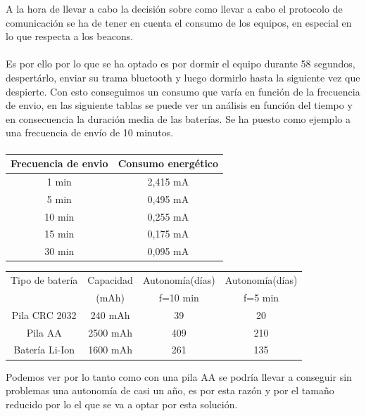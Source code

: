 \documentclass[a4paper ,12pt, onecolumn]{article}
\begin{document}
            A la hora de llevar a cabo la decisión sobre como llevar a cabo el protocolo de comunicación se ha de tener en cuenta 
            el consumo de los equipos, en especial en lo que respecta a los beacons.
            \paragraph{}
            Es por ello por lo que se ha optado es por dormir el equipo durante 58 segundos, despertárlo,
            enviar su trama bluetooth y luego dormirlo hasta la siguiente vez que despierte.
            Con esto conseguimos un consumo que varía en función de la frecuencia de envio, en las siguiente tablas
            se puede ver un análisis en función del tiempo y en consecuencia la duración media de las baterías.
            Se ha puesto como ejemplo a una frecuencia de envío de 10 minutos.
            \paragraph{}
            \begin{center}
                \begin{tabular}{||c || c ||} 
                \hline
                Frecuencia de envio  & Consumo energético  \\ [0.5ex] 
                \hline
                1 min &  2,415 mA \\
                5 min &  0,495 mA \\ 
                10 min &  0,255 mA \\ 
                15 min &  0,175 mA \\ 
                30 min &  0,095 mA \\ 
                \hline
                \end{tabular}
            \end{center}
            \begin{center}
                \begin{tabular}{|c | c| c| c |} 
                \hline
                    Tipo de batería & Capacidad  & Autonomía(días) & Autonomía(días)   \\ [0.5ex] 
                    & (mAh) &  f=10 min &  f=5 min   \\ [0.5ex] 
                \hline
                \hline
                    Pila CRC 2032 &  240 mAh  & 39   & 20 \\ 
                    Pila AA       &  2500 mAh & 409  & 210 \\ 
                    Batería Li-Ion&  1600 mAh & 261  & 135 \\ 
                \hline
                \end{tabular}
            \end{center}
            Podemos ver por lo tanto como con una pila AA se podría llevar a conseguir sin problemas una autonomía de casi un 
            año, es por esta razón y por el tamaño reducido por lo el que se va a optar por esta solución.
            
\end{document}
